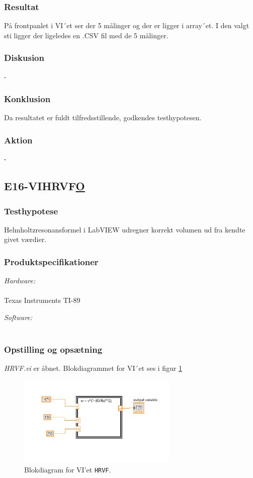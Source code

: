 \subsubsection{Resultat}

På frontpanlet i VI´et ser der 5 målinger og der er ligger i array´et. 
I den valgt sti ligger der ligeledes en .CSV fil med de 5 målinger.
\subsubsection{Diskusion}
-
\subsubsection{Konklusion}
Da resultatet er fuldt tilfredsstillende, godkendes testhypotesen. 
\subsubsection{Aktion}
- 

\subsection{E16-VIHRVF\underline{O}}
\subsubsection{Testhypotese}
		 Helmholtzresonansformel i LabVIEW udregner korrekt volumen ud fra kendte givet værdier. 
		\subsubsection{Produktspecifikationer}
	
		\textit{Hardware:}\\
		\PC\\
		Texas Instruments TI-89
	
		\textit{Software:}\\
		\labview\\
	
		\subsubsection{Opstilling og opsætning}
		\textit{HRVF.vi} er åbnet. Blokdiagrammet for VI´et ses i figur \ref{fig:HHRF} 
		
		\begin{figure}[htb]
			\centering
			\includegraphics[width=3in]{HelmholtzformelLabVIEW}
			\caption{Blokdiagram for VI'et \texttt{HRVF}.}
			\label{fig:HHRF}
		\end{figure}
		
